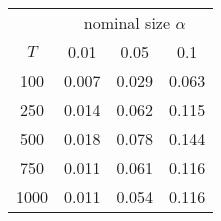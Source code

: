 % 
\begin{tabular}{cccc}
  \hline
  & \multicolumn{3}{c}{nominal size $\alpha$} \\
 $T$ & 0.01 & 0.05 & 0.1 \\
 \hline
100 & 0.007 & 0.029 & 0.063 \\ 
  250 & 0.014 & 0.062 & 0.115 \\ 
  500 & 0.018 & 0.078 & 0.144 \\ 
  750 & 0.011 & 0.061 & 0.116 \\ 
  1000 & 0.011 & 0.054 & 0.116 \\ 
   \hline
\end{tabular}
